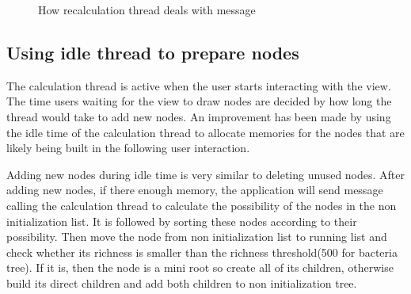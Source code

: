 \documentclass[MSc]{icldt}
\begin{document}
 \begin{figure}[H]
\caption{How recalculation thread deals with message}
 \end{figure}
 
 \subsection{Using idle thread to prepare nodes}

The calculation thread is active when the user starts interacting with the view. The time users waiting for the view to draw nodes are decided by how long the thread would take to add new nodes. An improvement has been made by using the idle time of the calculation thread to allocate memories for the nodes that are likely being built in the following user interaction. 

Adding new nodes during idle time is very similar to deleting unused nodes. After adding new nodes, if there enough memory, the application will send message calling the calculation thread to calculate the possibility of the nodes in the non initialization list. It is followed by sorting these nodes according to their possibility. Then move the node from non initialization list to running list and check whether its richness is smaller than the richness threshold(500 for bacteria tree). If it is, then the node is a mini root so create all of its children, otherwise build its direct children and add both children to non initialization tree. 
\end{document}
